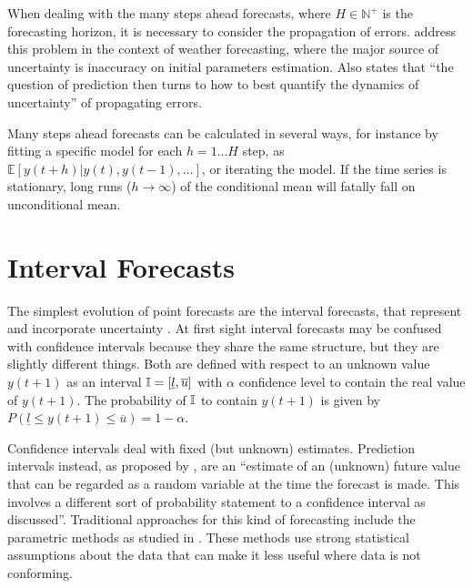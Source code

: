 When dealing with the many steps ahead forecasts, where $H \in \mathbb{N}^+$ is the forecasting horizon, it is necessary to consider the propagation of errors. \cite{Leutbecher2008} address this problem in the context of weather forecasting, where the major source of uncertainty is inaccuracy on initial parameters estimation. Also \cite{Smith2001} states that ``the question of prediction then turns to how to best quantify the dynamics of uncertainty'' of propagating errors.

Many steps ahead forecasts can be calculated in several ways, for instance by fitting a specific model for each $h = 1\ldots H$ step, as $\mathbb{E}[y(t+h)|y(t),y(t-1),\ldots]$, or iterating the model. If the time series is stationary, long runs ($h \rightarrow \infty$) of the conditional mean will fatally fall on unconditional mean.



%
\section{Interval Forecasts}
\label{sec:prob_interval}

The simplest evolution of point forecasts are the interval forecasts, that represent and incorporate uncertainty \cite{Hansen2006}. At first sight interval forecasts may be confused with confidence intervals because they share the same structure, but they are slightly different things. Both are defined with respect to an unknown value $y(t+1)$ as an interval $\mathbb{I} = [\underline{l},\overline{u}{]}$  with $\alpha$ confidence level to contain the real value of $y(t+1)$. The probability of $\mathbb{I}$ to contain $y(t+1)$ is given by $P(\underline{l} \leq y(t+1) \leq \overline{u}) = 1 - \alpha$.


Confidence intervals deal with fixed (but unknown) estimates. Prediction intervals instead, as proposed by \cite{Chatfield1993}, are an ``estimate of an (unknown) future value that can be regarded as a random variable at the time the forecast is made. This involves a different sort of probability statement to a confidence interval as discussed''. Traditional approaches for this kind of forecasting include the parametric methods as studied in  \cite{Chatfield1993}. These methods use strong statistical assumptions about the data that can make it less useful where data is not conforming.

